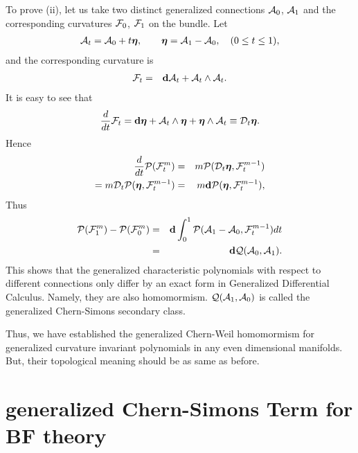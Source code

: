 \documentclass[a4paper,twocolumn,showpacs,prd]{revtex4}
\begin{document}
To prove (ii), let us take  two distinct generalized connections
${\cal A}_0$, ${\cal A}_1$ and the corresponding curvatures ${\cal
F}_0$, ${\cal F}_1$ on the bundle. Let
\begin{eqnarray}
{\cal A}_t={\cal A}_0+t {\mbox {\boldmath
$\eta$}}, \qquad {\mbox {\boldmath $\eta$}}={\cal
A}_1-{\cal A}_0, ~~~ (0\leq t \leq 1),
\end{eqnarray}
and the corresponding curvature is
\begin{eqnarray}
{\cal F}_t&=&{\bf d} {\cal A}_t+{\cal A}_t\wedge
{\cal A}_t.
\end{eqnarray}
It is easy to see that
\begin{eqnarray}
{d \over dt} {\cal F}_t={\bf d} {\bm \eta}+{\cal A}_t\wedge {\bm
\eta}+{\bm \eta}\wedge {\cal A}_t\equiv {\cal D}_t{\bm \eta}.
\end{eqnarray}
 Hence
\begin{eqnarray}
{d\over dt} {\cal P}({\cal F}_t^m)&=&m {\cal P} ({\cal D}_t{\mbox
{\boldmath $\eta$}},{\cal F}_t^{m-1}) \nonumber\\
=m {\cal D}_t {\cal P}({\mbox {\boldmath $\eta$}},{\cal
F}_t^{m-1}) &=& m {\bf d} {\cal P}({\mbox {\boldmath $\eta$}}, {\cal
F}_t^{m-1}),
\end{eqnarray}
Thus
\begin{eqnarray}
{\cal P}({\cal F}^m_1)-{\cal P}({\cal F}^m_0)
 &=&{\bf d} \int_0^1
{\cal P} ({\cal A}_1-{\cal A}_0 ,{\cal F}^{m-1}_t) dt \nonumber\\
 &=&{\bf d}
{\cal Q} ({\cal A}_0, {\cal A}_1).
\end{eqnarray}
This shows that the generalized characteristic polynomials with
respect to different connections only differ by an exact form in
Generalized Differential Calculus. Namely, they are also
homomormism. ${\cal Q}({\cal A}_1,{\cal A}_0)$ is called the
generalized  Chern-Simons secondary class.

Thus, we have established the generalized
Chern-Weil homomormism for generalized curvature
invariant polynomials in any even dimensional
manifolds. But, their topological meaning should
be as same as before.

\section{generalized Chern-Simons Term for BF theory}
\end{document}
